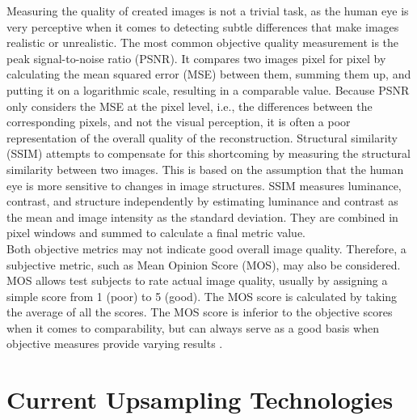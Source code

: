 \documentclass[letterpaper, 10 pt, conference]{ieeeconf}  %
\begin{document}
Measuring the quality of created images is not a trivial task, as the human eye is very perceptive when it comes to detecting subtle differences that make images realistic or unrealistic.
The most common objective quality measurement is the peak signal-to-noise ratio (PSNR). 
It compares two images pixel for pixel by calculating the mean squared error (MSE) between them, summing them up, and putting it on a logarithmic scale, resulting in a comparable value.
Because PSNR only considers the MSE at the pixel level, i.e., the differences between the corresponding pixels, and not the visual perception, it is often a poor representation of the overall quality of the reconstruction.
Structural similarity (SSIM) attempts to compensate for this shortcoming by measuring the structural similarity between two images. 
This is based on the assumption that the human eye is more sensitive to changes in image structures.
SSIM measures luminance, contrast, and structure independently by estimating luminance and contrast as the mean and image intensity as the standard deviation.
They are combined in pixel windows and summed to calculate a final metric value. \\
Both objective metrics may not indicate good overall image quality. Therefore, a subjective metric, such as Mean Opinion Score (MOS), may also be considered.
MOS allows test subjects to rate actual image quality, usually by assigning a simple score from 1 (poor) to 5 (good).
The MOS score is calculated by taking the average of all the scores. 
The MOS score is inferior to the objective scores when it comes to comparability, but can always serve as a good basis when objective measures provide varying results \cite{wang2020deep} \cite{Soufi2022BenchmarkOD}.


\section{Current Upsampling Technologies}
\label{Sec:Current}
\end{document}
